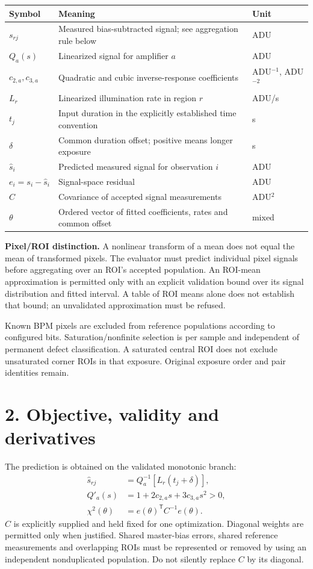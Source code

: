 \documentclass[11pt,a4paper]{article}
\begin{document}
\begin{tabularx}{\linewidth}{@{}lXl@{}}\toprule
Symbol&Meaning&Unit\\\midrule
$s_{rj}$&Measured bias-subtracted signal; see aggregation rule below&ADU\\
$Q_a(s)$&Linearized signal for amplifier $a$&ADU\\
$c_{2,a},c_{3,a}$&Quadratic and cubic inverse-response coefficients&
ADU$^{-1}$, ADU$^{-2}$\\
$L_r$&Linearized illumination rate in region $r$&ADU/s\\
$t_j$&Input duration in the explicitly established time convention&s\\
$\delta$&Common duration offset; positive means longer exposure&s\\
$\widehat s_i$&Predicted measured signal for observation $i$&ADU\\
$e_i=s_i-\widehat s_i$&Signal-space residual&ADU\\
$C$&Covariance of accepted signal measurements&ADU$^2$\\
$\theta$&Ordered vector of fitted coefficients, rates and common offset&mixed\\\bottomrule
\end{tabularx}

\textbf{Pixel/ROI distinction.} A nonlinear transform of a mean does not equal
the mean of transformed pixels. The evaluator must predict individual pixel
signals before aggregating over an ROI's accepted population. An ROI-mean
approximation is permitted only with an explicit validation bound over its
signal distribution and fitted interval. A table of ROI means alone does not
establish that bound; an unvalidated approximation must be refused.

Known BPM pixels are excluded from reference populations according to configured
bits. Saturation/nonfinite selection is per sample and independent of permanent
defect classification. A saturated central ROI does not exclude unsaturated
corner ROIs in that exposure. Original exposure order and pair identities remain.

\clearpage
\section*{2. Objective, validity and derivatives}
The prediction is obtained on the validated monotonic branch:
\begin{align}
\widehat s_{rj}
 &=Q_a^{-1}\!\left[L_r(t_j+\delta)\right],\\
Q'_a(s)&=1+2c_{2,a}s+3c_{3,a}s^2>0,\\
\chi^2(\theta)&=e(\theta)^{\mathsf T}C^{-1}e(\theta).
\end{align}
$C$ is explicitly supplied and held fixed for one optimization. Diagonal weights
are permitted only when justified. Shared master-bias errors, shared reference
measurements and overlapping ROIs must be represented or removed by using an
independent nonduplicated population. Do not silently replace $C$ by its diagonal.
\end{document}
